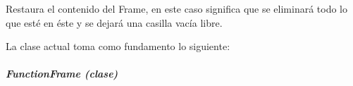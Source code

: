 \documentclass[letterpaper,10pt,english]{sphinxmanual}
\begin{document}
\begin{fulllineitems}
\begin{fulllineitems}
\begin{quote}
\begin{description}
\end{description}\end{quote}

\end{fulllineitems}


\begin{fulllineitems}
\label{View/Main/ObjectiveFunction/ObjectiveFunctionFrame:View.Main.ObjectiveFunction.ObjectiveFunctionFrame.ObjectiveFunctionFrame.restore_settings}
Restaura el contenido del Frame, en este caso significa que se eliminará
todo lo que esté en éste y se dejará una casilla vacía libre.

\end{fulllineitems}


\end{fulllineitems}


La clase actual toma como fundamento lo siguiente:


\subparagraph{FunctionFrame (clase)}
\label{View/Main/ObjectiveFunction/FunctionFrame::doc}\label{View/Main/ObjectiveFunction/FunctionFrame:module-View.Main.ObjectiveFunction.FunctionFrame}\label{View/Main/ObjectiveFunction/FunctionFrame:functionframe-clase}
\end{document}
